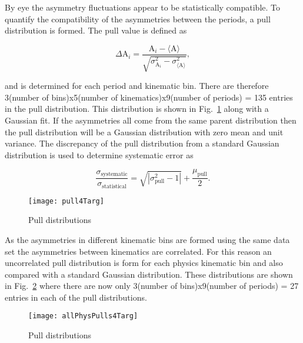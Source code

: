 \noindent
By eye the asymmetry fluctuations appear to be statistically compatible.  To
quantify the compatibility of the asymmetries between the periods, a pull
distribution is formed.  The pull value is defined as

\begin{equation}
  \label{eq::pull}
  \Delta\mathrm{A}_i =
  \frac{
    \mathrm{A}_i - \langle \mathrm{A} \rangle
  }{
    \sqrt{
      \sigma^2_{\mathrm{A}_i} - \sigma^2_{\langle \mathrm{A} \rangle}
    }
  },
\end{equation}

\noindent
and is determined for each period and kinematic bin.  There are therefore
3(number of bins)x5(number of kinematics)x9(number of periods) = 135 entries in
the pull distribution. This distribution is shown in Fig.~\ref{fig::pull4Targ}
along with a Gaussian fit.  If the asymmetries all come from the same parent
distribution then the pull distribution will be a Gaussian distribution with
zero mean and unit variance.  The discrepancy of the pull distribution from a
standard Gaussian distribution is used to determine systematic error as

\begin{equation}
  \frac{\sigma_{\mathrm{systematic}}}{\sigma_{\mathrm{statistical}}} =
  \sqrt{|\sigma^2_{\mathrm{pull}} - 1|} + \frac{\mu_{\mathrm{pull}}}{2}.
\end{equation}

\begin{figure}[h!t]
  \begin{center}
    \texttt{[image: pull4Targ]}
    \caption{Pull distributions}
    \label{fig::pull4Targ}
  \end{center}
\end{figure}

\noindent
As the asymmetries in different kinematic bins are formed using the same data
set the asymmetries between kinematics are correlated.  For this reason an
uncorrelated pull distribution is form for each physics kinematic bin and also
compared with a standard Gaussian distribution.  These distributions are shown
in Fig.~\ref{fig::allPhysPulls4Targ} where there are now only 3(number of
bins)x9(number of periods) = 27 entries in each of the pull distributions.

\begin{figure}[h!t]
  \begin{center}
    \texttt{[image: allPhysPulls4Targ]}
    \caption{Pull distributions}
    \label{fig::allPhysPulls4Targ}
  \end{center}
\end{figure}

